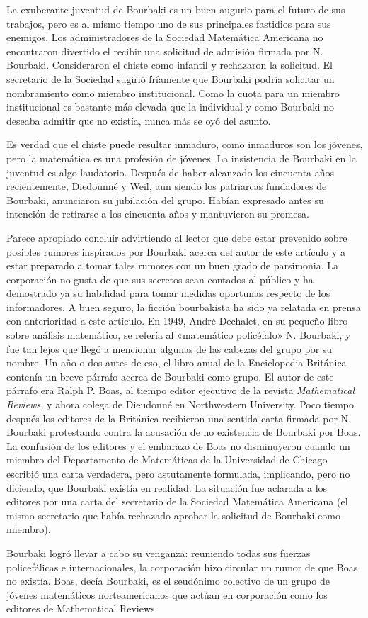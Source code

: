 \documentclass[a4paper, 12pt]{article}
\begin{document}
La exuberante juventud de Bourbaki es un buen augurio para el futuro de 
sus trabajos, pero es al mismo tiempo uno de sus principales fastidios para 
sus enemigos. Los administradores de la Sociedad Matemática Americana no 
encontraron divertido el recibir una solicitud de admisión firmada por 
N. Bourbaki. Consideraron el chiste como infantil y rechazaron la solicitud. 
El secretario de la Sociedad sugirió fríamente que Bourbaki 
podría solicitar un nombramiento como miembro institucional. Como la 
cuota para un miembro institucional es bastante más elevada que la 
individual y como Bourbaki no deseaba admitir que no existía, nunca 
más se oyó del asunto. 

Es verdad que el chiste puede resultar inmaduro, como inmaduros son los 
jóvenes, pero la matemática es una profesión de jóvenes. La 
insistencia de Bourbaki en la juventud es algo laudatorio. Después de 
haber alcanzado los cincuenta años recientemente, Diedounné y Weil, 
aun siendo los patriarcas fundadores de Bourbaki, anunciaron su 
jubilación del grupo. Habían expresado antes su intención de 
retirarse a los cincuenta años y mantuvieron su promesa. 

Parece apropiado concluir advirtiendo al lector que debe estar 
prevenido sobre posibles rumores inspirados por Bourbaki acerca del autor de 
este artículo y a estar preparado a tomar tales rumores con un buen 
grado de parsimonia. La corporación no gusta de que sus secretos sean 
contados al público y ha demostrado ya su habilidad para tomar medidas 
oportunas respecto de los informadores. A buen seguro, la ficción 
bourbakista ha sido ya relatada en prensa con anterioridad a este 
artículo. En 1949, André Dechalet, en su pequeño libro sobre 
análisis matemático, se refería al «matemático 
policéfalo» N. Bourbaki, y fue tan lejos que llegó a mencionar 
algunas de las cabezas del grupo por su nombre. Un año o dos antes de 
eso, el libro anual de la Enciclopedia Británica contenía un breve 
párrafo acerca de Bourbaki como grupo. El autor de este párrafo era 
Ralph P. Boas, al tiempo editor ejecutivo de la revista {\it Mathematical 
Reviews,} y ahora colega de Dieudonné en Northwestern University. Poco 
tiempo después los editores de la Británica recibieron una sentida 
carta firmada por N. Bourbaki protestando contra la acusación de no 
existencia de Bourbaki por Boas. La confusión de los editores y el 
embarazo de Boas no disminuyeron cuando un miembro del Departamento de 
Matemáticas de la Universidad de Chicago escribió una carta 
verdadera, pero astutamente formulada, implicando, pero no diciendo, que 
Bourbaki existía en realidad. La situación fue aclarada a los 
editores por una carta del secretario de la Sociedad Matemática 
Americana (el mismo secretario que había rechazado aprobar la solicitud 
de Bourbaki como miembro). 

Bourbaki logró llevar a cabo su venganza: reuniendo todas sus 
fuerzas policefálicas e internacionales, la corporación hizo 
circular un rumor de que Boas no existía. Boas, decía Bourbaki, es 
el seudónimo colectivo de un grupo de jóvenes matemáticos 
norteamericanos que actúan en corporación como los editores de 
Mathematical Reviews. 
\end{document}
